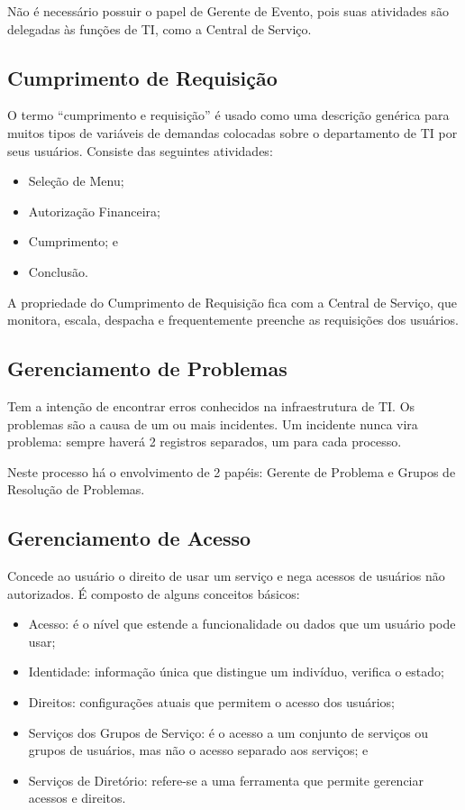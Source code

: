 Não é necessário possuir o papel de Gerente de Evento, pois suas atividades são
delegadas às funções de TI, como a Central de Serviço.


\subsection{Cumprimento de Requisição}
O termo “cumprimento e requisição” é usado como uma descrição genérica para
muitos tipos de variáveis de demandas colocadas sobre o departamento de TI por
seus usuários. Consiste das seguintes atividades:
\begin{itemize}
	\item Seleção de Menu;
	\item Autorização Financeira;
	\item Cumprimento; e
	\item Conclusão.
\end{itemize}

A propriedade do Cumprimento de Requisição fica com a Central de Serviço, que
monitora, escala, despacha e frequentemente preenche as requisições dos
usuários.


\subsection{Gerenciamento de Problemas}
Tem a intenção de encontrar erros conhecidos na infraestrutura de TI. Os
problemas são a causa de um ou mais incidentes. Um incidente nunca vira
problema: sempre haverá 2 registros separados, um para cada processo.

Neste processo há o envolvimento de 2 papéis: Gerente de Problema e Grupos de
Resolução de Problemas.


\subsection{Gerenciamento de Acesso}
Concede ao usuário o direito de usar um serviço e nega acessos de usuários não
autorizados. É composto de alguns conceitos básicos:
\begin{itemize}
    \item Acesso: é o nível que estende a funcionalidade ou dados que um
        usuário pode usar;
    \item Identidade: informação única que distingue um indivíduo, verifica o
        estado;
	\item Direitos: configurações atuais que permitem o acesso dos usuários;
    \item Serviços dos Grupos de Serviço: é o acesso a um conjunto de serviços
        ou grupos de usuários, mas não o acesso separado aos serviços; e
    \item Serviços de Diretório: refere-se a uma ferramenta que permite
        gerenciar acessos e direitos.
\end{itemize}

